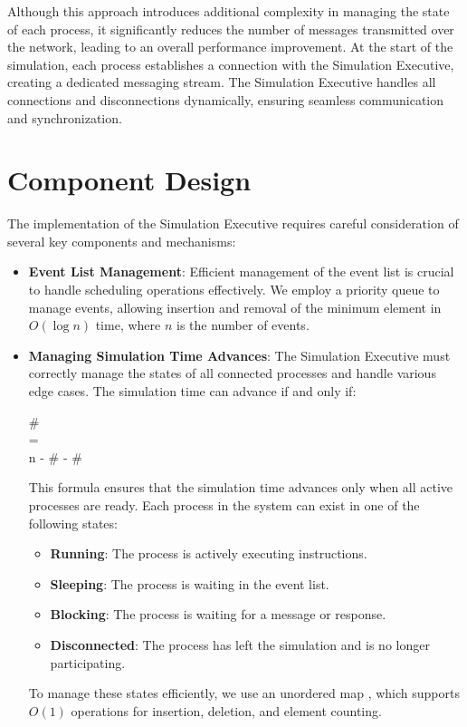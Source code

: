 Although this approach introduces additional complexity in managing the state of each process, it significantly reduces the number of messages transmitted over the network, leading to an overall performance improvement. At the start of the simulation, each process establishes a connection with the Simulation Executive, creating a dedicated messaging stream. The Simulation Executive handles all connections and disconnections dynamically, ensuring seamless communication and synchronization.

\section{Component Design}

The implementation of the Simulation Executive requires careful consideration of several key components and mechanisms:

\begin{itemize}
    \item \textbf{Event List Management}: Efficient management of the event list is crucial to handle scheduling operations effectively. We employ a priority queue \cite{pqueue} to manage events, allowing insertion and removal of the minimum element in $O(\log n)$ time, where $n$ is the number of events.

    \item \textbf{Managing Simulation Time Advances}: The Simulation Executive must correctly manage the states of all connected processes and handle various edge cases. The simulation time can advance if and only if:

    \begin{center}
        \# \\ = \\  n - \# - \#
    \end{center}

    This formula ensures that the simulation time advances only when all active processes are ready. Each process in the system can exist in one of the following states:

    \begin{itemize}
        \item \textbf{Running}: The process is actively executing instructions.
        \item \textbf{Sleeping}: The process is waiting in the event list.
        \item \textbf{Blocking}: The process is waiting for a message or response.
        \item \textbf{Disconnected}: The process has left the simulation and is no longer participating.
    \end{itemize}

    To manage these states efficiently, we use an unordered map \cite{umap}, which supports $O(1)$ operations for insertion, deletion, and element counting.
\end{itemize}

